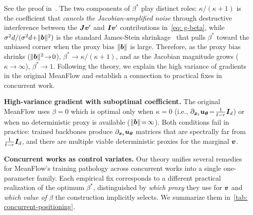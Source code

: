 See the proof in~. The two components of $\beta^{\ast}$ play distinct roles: $\kappa/(\kappa{+}1)$ is the coefficient that \emph{cancels the Jacobian-amplified noise} through destructive interference between the ${\bm{J}}{\bm{v}}^{\prime}$ and ${\bm{I}}{\bm{v}}^{\prime}$ contributions in~\eqref{eq: g-beta}, while $\sigma^{2}d/(\sigma^{2}d{+}\|{\bm{b}}\|^{2})$ is the standard James-Stein shrinkage~\cite{james1961estimation} that pulls $\beta^{\ast}$ toward the unbiased corner when the proxy bias $\|{\bm{b}}\|$ is large. Therefore, as the proxy bias shrinks ($\|{\bm{b}}\|^{2}\!\to\!0$), $\beta^{\ast}\!\to\!\kappa/(\kappa{+}1)$, and as the Jacobian magnitude grows ($\kappa\!\to\!\infty$), $\beta^{\ast}\!\to\!1$. Following the theory, we explain the high variance of gradients in the original MeanFlow and establish a connection to practical fixes in concurrent work.

\noindent\textbf{High-variance gradient with suboptimal coefficient.} The original MeanFlow uses $\beta\!=\!0$ which is optimal only when $\kappa\!=\!0$ (i.e., $\partial_{{\bm{x}}_{t}}{\bm{u}}_{{\bm{\theta}}}\!=\!\frac{1}{t-r}{\bm{I}}_{d}$) or when no deterministic proxy is available ($\|{\bm{b}}\|\!=\!\infty$). Both conditions fail in practice: trained backbones produce $\partial_{{\bm{x}}_{t}}{\bm{u}}_{{\bm{\theta}}}$ matrices that are spectrally far from $\frac{1}{t-r}{\bm{I}}_{d}$, and there are multiple viable deterministic proxies for the marginal ${\bm{v}}$.



\noindent\textbf{Concurrent works as control variates.} Our theory unifies several remedies for MeanFlow's training pathology across concurrent works into a single one-parameter family. Each empirical fix corresponds to a different practical realization of the optimum $\beta^{\ast}$, distinguished by \emph{which proxy} they use for ${\bm{v}}$ and \emph{which value of $\beta$} the construction implicitly selects. We summarize them in~\cref{tab: concurrent-positioning}.
